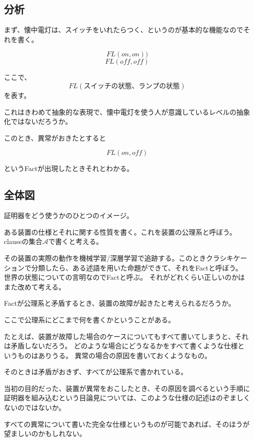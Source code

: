 \documentclass[10pt, oneside]{jarticle}   	%
\theoremstyle{definition}
\begin{document}
\subsection{分析}
まず、懐中電灯は、スイッチをいれたらつく、というのが基本的な機能なのでそれを書く。

\begin{equation}
FL(on,on))
\end{equation}
\begin{equation}
FL(off,off)
\end{equation}

ここで、$$FL(スイッチの状態、ランプの状態)$$を表す。

これはきわめて抽象的な表現で、懐中電灯を使う人が意識しているレベルの抽象化ではないだろうか。

このとき、異常がおきたとすると

\begin{equation}
FL(on,off)
\end{equation}

というFactが出現したときそれとわかる。

\subsection{全体図}
証明器をどう使うかのひとつのイメージ。

ある装置の仕様とそれに関する性質を書く。これを装置の公理系と呼ぼう。
clauseの集合$\mathcal{A}$で書くと考える。


その装置の実際の動作を機械学習/深層学習で追跡する。このときクラシキケーションで分類したら、ある述語を用いた命題ができて、それをFactと呼ぼう。
世界の状態についての言明なのでFactと呼ぶ。
それがどれくらい正しいのかはまた改めて考える。

Factが公理系と矛盾するとき、装置の故障が起きたと考えられるだろうか。

ここで公理系にどこまで何を書くかということがある。

たとえば、装置が故障した場合のケースについてもすべて書いてしまうと、それは矛盾しないだろう。
どのような場合にどうなるかをすべて書くような仕様というものはありうる。
異常の場合の原因を書いておくようなもの。

そのときは矛盾がおきず、すべてが公理系で書かれている。

当初の目的だった、装置が異常をおこしたとき、その原因を調べるという手順に証明器を組み込むという目論見については、このような仕様の記述はのぞましくないのではないか。

すべての異常について書いた完全な仕様というものが可能であれば、そのほうが望ましいのかもしれない。
\end{document}
